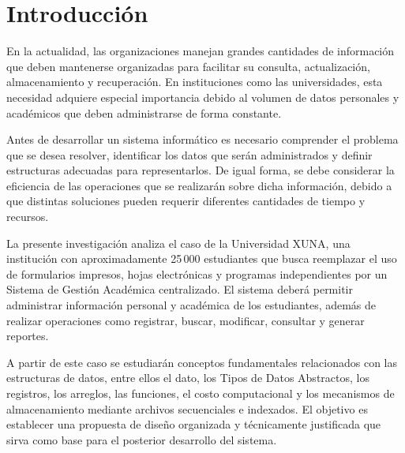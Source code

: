 \section{Introducción}

En la actualidad, las organizaciones manejan grandes cantidades de
información que deben mantenerse organizadas para facilitar su consulta,
actualización, almacenamiento y recuperación. En instituciones como las
universidades, esta necesidad adquiere especial importancia debido al
volumen de datos personales y académicos que deben administrarse de forma
constante.

Antes de desarrollar un sistema informático es necesario comprender el
problema que se desea resolver, identificar los datos que serán
administrados y definir estructuras adecuadas para representarlos. De
igual forma, se debe considerar la eficiencia de las operaciones que se
realizarán sobre dicha información, debido a que distintas soluciones
pueden requerir diferentes cantidades de tiempo y recursos.

La presente investigación analiza el caso de la Universidad XUNA, una
institución con aproximadamente 25\,000 estudiantes que busca reemplazar
el uso de formularios impresos, hojas electrónicas y programas
independientes por un Sistema de Gestión Académica centralizado. El
sistema deberá permitir administrar información personal y académica de
los estudiantes, además de realizar operaciones como registrar, buscar,
modificar, consultar y generar reportes.

A partir de este caso se estudiarán conceptos fundamentales relacionados
con las estructuras de datos, entre ellos el dato, los Tipos de Datos
Abstractos, los registros, los arreglos, las funciones, el costo
computacional y los mecanismos de almacenamiento mediante archivos
secuenciales e indexados. El objetivo es establecer una propuesta de
diseño organizada y técnicamente justificada que sirva como base para el
posterior desarrollo del sistema.